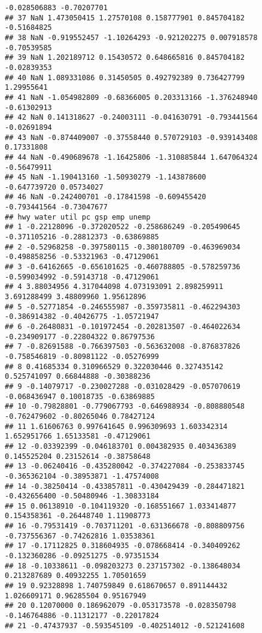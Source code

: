 \documentclass[]{article}
\begin{document}
\begin{verbatim}
-0.028506883 -0.70207701
## 37 NaN 1.473050415 1.27570108 0.158777901 0.845704182
-0.51684825
## 38 NaN -0.919552457 -1.10264293 -0.921202275 0.007918578
-0.70539585
## 39 NaN 1.202189712 0.15430572 0.648665816 0.845704182
-0.02839353
## 40 NaN 1.089331086 0.31450505 0.492792389 0.736427799
1.29955641
## 41 NaN -1.054982809 -0.68366005 0.203313166 -1.376248940
-0.61302913
## 42 NaN 0.141318627 -0.24003111 -0.041630791 -0.793441564
-0.02691894
## 43 NaN -0.874409007 -0.37558440 0.570729103 -0.939143408
0.17331808
## 44 NaN -0.490689678 -1.16425806 -1.310885844 1.647064324
-0.56479911
## 45 NaN -1.190413160 -1.50930279 -1.143878600
-0.647739720 0.05734027
## 46 NaN -0.242400701 -0.17841598 -0.609455420
-0.793441564 -0.73047677
## hwy water util pc gsp emp unemp
## 1 -0.22128096 -0.372020522 -0.258686249 -0.205490645
-0.371105216 -0.28812373 -0.63869885
## 2 -0.52968258 -0.397580115 -0.380180709 -0.463969034
-0.498858256 -0.53321963 -0.47129061
## 3 -0.64162665 -0.656101625 -0.460788805 -0.578259736
-0.599034992 -0.59143718 -0.47129061
## 4 3.88034956 4.317044098 4.073193091 2.898259911
3.691288499 3.48809960 1.95612896
## 5 -0.52771854 -0.246555987 -0.359735811 -0.462294303
-0.386914382 -0.40426775 -1.05721947
## 6 -0.26480831 -0.101972454 -0.202813507 -0.464022634
-0.234909177 -0.22804322 0.86797536
## 7 -0.82691588 -0.766397503 -0.563632008 -0.876837826
-0.758546819 -0.80981122 -0.05276999
## 8 0.41685334 0.310966529 0.322030446 0.327435142
0.525741097 0.66844888 -0.30388236
## 9 -0.14079717 -0.230027288 -0.031028429 -0.057070619
-0.068436947 0.10018735 -0.63869885
## 10 -0.79828801 -0.779067793 -0.646988934 -0.808880548
-0.762479602 -0.80265046 0.78427124
## 11 1.61606763 0.997641645 0.996309693 1.603342314
1.652951766 1.65133581 -0.47129061
## 12 -0.03392399 -0.046183701 0.004382935 0.403436389
0.145525204 0.23152614 -0.38758648
## 13 -0.06240416 -0.435280042 -0.374227084 -0.253833745
-0.365362104 -0.38953871 -1.47574008
## 14 -0.38250414 -0.433857811 -0.430429439 -0.284471821
-0.432656400 -0.50480946 -1.30833184
## 15 0.06138910 -0.104119320 -0.168551667 1.033414877
0.154358361 -0.26448740 1.11908773
## 16 -0.79531419 -0.703711201 -0.631366678 -0.808809756
-0.737556367 -0.74262816 1.03538361
## 17 -0.17112825 0.318604935 -0.078668414 -0.340409262
-0.132360286 -0.09251275 -0.97351534
## 18 -0.10338611 -0.098203273 0.237157302 -0.138648034
0.213287689 0.40932255 1.70501659
## 19 0.92328898 1.740759849 0.618670657 0.891144432
1.026609171 0.96285504 0.95167949
## 20 0.12070000 0.186962079 -0.053173578 -0.028350798
-0.146764886 -0.11312177 -0.22017824
## 21 -0.47437937 -0.593545109 -0.402514012 -0.521241608

\end{verbatim}
\end{document}
